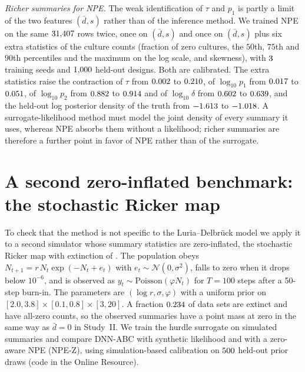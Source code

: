 \documentclass[sn-basic,iicol,pdflatex]{sn-jnl}
\begin{document}
\emph{Richer summaries for NPE.} The weak identification of $\tau$ and $p_1$ is partly a limit of the two features $(\bar d,s)$ rather than of the inference method. We trained NPE on the same
$31{,}407$ rows twice, once on $(\bar d,s)$ and once on $(\bar d,s)$ plus six extra statistics of the culture counts (fraction of zero cultures, the $50$th, $75$th and $90$th percentiles and the maximum on the log scale, and
skewness), with $3$ training seeds and $1{,}000$ held-out designs. Both are calibrated. The extra statistics raise the contraction of $\tau$ from $0.002$ to
$0.210$, of $\log_{10}p_1$ from $0.017$ to $0.051$, of $\log_{10}p_2$ from $0.882$ to
$0.914$ and of $\log_{10}\delta$ from $0.602$ to $0.639$, and the held-out log posterior density of the truth from
$-1.613$ to $-1.018$. A surrogate-likelihood method must model the joint density of every summary it uses, whereas NPE absorbs them without a likelihood; richer summaries are therefore a further
point in favor of NPE rather than of the surrogate.

\section{A second zero-inflated benchmark: the stochastic Ricker map}\label{sec:ricker}
To check that the method is not specific to the Luria--Delbr\"uck model we apply it to a second simulator whose summary statistics are zero-inflated, the stochastic Ricker map with extinction
of \citet{wood2010}. The population obeys $N_{t+1}=r\,N_t\exp(-N_t+e_t)$ with $e_t\sim\mathcal N(0,\sigma^2)$, falls to zero when it drops below $10^{-6}$, and is observed as
$y_t\sim\mathrm{Poisson}(\varphi N_t)$ for $T=100$ steps after a 50-step burn-in. The parameters are $(\log r,\sigma,\varphi)$ with a uniform prior on $[2.0,3.8]\times[0.1,0.8]\times[3,20]$.
A fraction $0.234$ of data sets are extinct and have all-zero counts, so the observed summaries have a point mass at zero in the same way as $\bar d=0$ in Study~II.
We train the hurdle surrogate on simulated summaries and compare DNN-ABC with synthetic likelihood \citep{wood2010,price2018} and with a zero-aware NPE (NPE-Z), using
simulation-based calibration on $500$ held-out prior draws (code in the Online Resource).
\end{document}
